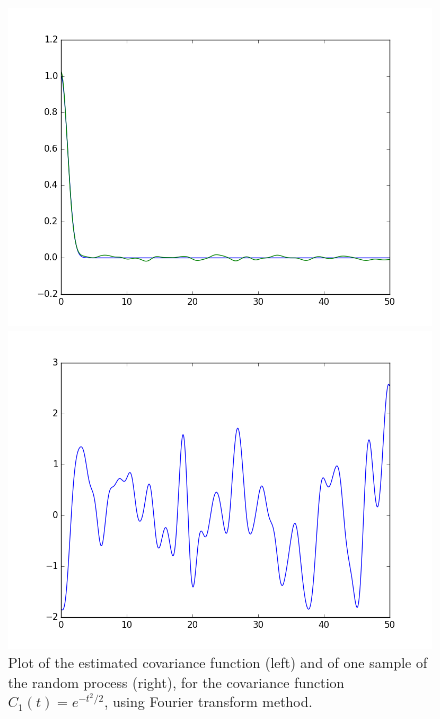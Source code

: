 \documentclass[a4paper,11pt]{article}
\theoremstyle{definition}
\theoremstyle{plain}
\theoremstyle{remark}
\begin{document}
\begin{figure}[htbp]
\centering
\begin{minipage}[c]{.47\textwidth}
\includegraphics[width=\textwidth,
keepaspectratio]{ex6_C1_dft_cov.png}
\end{minipage}
\hspace{4mm}
\begin{minipage}[c]{.47\textwidth}
\includegraphics[width=\textwidth,
keepaspectratio]{ex6_C1_dft_sample.png}
\end{minipage}
\caption{ \label{figure:ex6_C1_dft} Plot of the estimated covariance function (left) and of one sample of the random process (right), for the covariance function $C_1(t) = e^{-t^2/2}$, using Fourier transform method.}
\end{figure}
\end{document}

